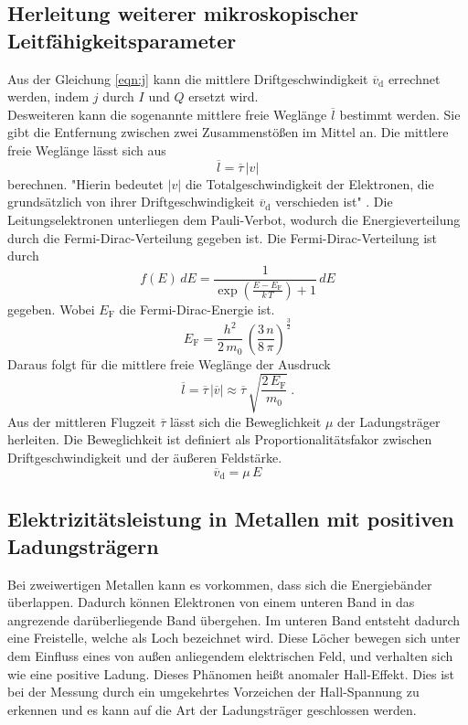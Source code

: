 \subsection{Herleitung weiterer mikroskopischer Leitfähigkeitsparameter}
Aus der Gleichung \eqref{eqn:j} kann die mittlere Driftgeschwindigkeit $\overline{v}_\text{d}$ errechnet werden, indem $j$ durch $I$ und $Q$ ersetzt wird. \\
Desweiteren kann die sogenannte mittlere freie Weglänge $\overline{l}$ bestimmt werden. Sie gibt die Entfernung zwischen zwei Zusammenstößen im Mittel an. Die mittlere freie Weglänge lässt sich aus
\begin{equation}
	\overline{l} = \overline{\tau}\,|v|
	\label{eqn:l}
\end{equation}
berechnen. "Hierin bedeutet $|v|$ die Totalgeschwindigkeit der Elektronen, die grundsätzlich von ihrer Driftgeschwindigkeit $\overline{v}_\text{d}$ verschieden ist" \cite[6]{sample}. Die Leitungselektronen unterliegen dem Pauli-Verbot, wodurch die Energieverteilung durch die Fermi-Dirac-Verteilung gegeben ist. Die Fermi-Dirac-Verteilung ist durch
\begin{equation}
	f(E)\,dE = \frac{1}{\exp\left(\frac{E - E_\text{F}}{k\,T}\right) + 1}\,dE
\end{equation}
gegeben. Wobei $E_\text{F}$ die Fermi-Dirac-Energie ist.
\begin{equation}
	E_\text{F} = \frac{h^2}{2\,m_0}\,\left(\frac{3\,n}{8\,\pi} \right)^{\frac{3}{2}}
\end{equation}
Daraus folgt für die mittlere freie Weglänge der Ausdruck
\begin{equation}
	\overline{l} = \overline{\tau}\,|\overline{v}| \approx \overline{\tau}\,\sqrt{\frac{2\,E_\text{F}}{m_0}} \ .
\end{equation}
Aus der mittleren Flugzeit $\overline{\tau}$ lässt sich die Beweglichkeit $\mu$ der Ladungsträger herleiten. Die Beweglichkeit ist definiert als Proportionalitätsfakor zwischen Driftgeschwindigkeit und der äußeren Feldstärke.
\begin{equation}
	\overline{v}_\text{d} = \mu\,E
	\label{eqn:Beweglichkeit}
\end{equation}


\subsection{Elektrizitätsleistung in Metallen mit positiven Ladungsträgern}
Bei zweiwertigen Metallen kann es vorkommen, dass sich die Energiebänder überlappen. Dadurch können Elektronen von einem unteren Band in das angrezende darüberliegende Band übergehen. Im unteren Band entsteht dadurch eine Freistelle, welche als Loch bezeichnet wird. Diese Löcher bewegen sich unter dem Einfluss eines von außen anliegendem elektrischen Feld, und verhalten sich wie eine positive Ladung. Dieses Phänomen heißt anomaler Hall-Effekt. Dies ist bei der Messung durch ein umgekehrtes Vorzeichen der Hall-Spannung zu erkennen und es kann auf die Art der Ladungsträger geschlossen werden.







